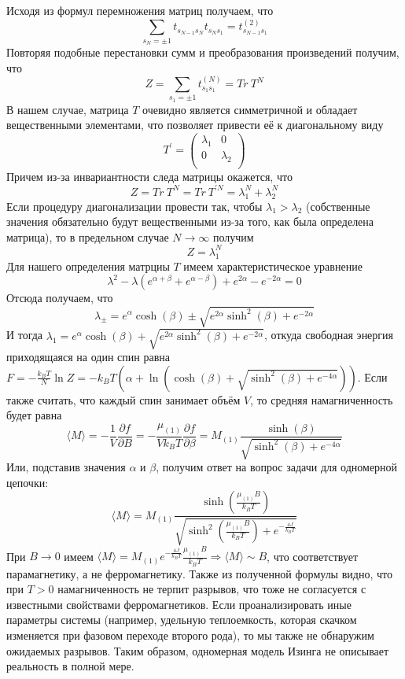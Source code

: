\documentclass[oneside,final,14pt]{extarticle}
\begin{document}
	Исходя из формул перемножения матриц получаем, что 
$$\sum_{s_{N}=\pm 1}t_{s_{N-1}s_{N}}t_{s_{N}s_{1}}=t^{(2)}_{s_{N-1}s_{1}}$$
	Повторяя подобные перестановки сумм и преобразования произведений получим, что 
$$Z=\sum_{s_{1}=\pm 1}t^{(N)}_{s_{1}s_{1}}=Tr \ T^{N}$$
	В нашем случае, матрица $T$ очевидно является симметричной и обладает вещественными элементами, что позволяет привести её к диагональному виду 
$$
T^\prime=
\begin{pmatrix}
\lambda_{1} & 0 \\
0 & \lambda_{2} \\
\end{pmatrix}
$$
	Причем из-за инвариантности следа матрицы окажется, что 
$$Z=Tr \ T^{N}=Tr \ T^{\prime N}=\lambda_{1}^N+\lambda_{2}^{N}$$
	Если процедуру диагонализации провести так, чтобы $\lambda_{1} > \lambda_{2}$ (собственные значения обязательно будут вещественными из-за того, как была определена матрица), то в предельном случае $N\rightarrow \infty$ получим 
$$Z=\lambda_1^{N}$$
	Для нашего определения матрциы $T$ имеем характеристическое уравнение 
$$\lambda^2-\lambda(e^{\alpha+\beta}+e^{\alpha-\beta})+e^{2\alpha}-e^{-2\alpha}=0$$
	Отсюда получаем, что 
$$\lambda_{\pm}=e^{\alpha}\cosh(\beta)\pm\sqrt{e^{2\alpha}\sinh^{2}(\beta)+e^{-2\alpha}}$$
	И тогда $\lambda_{1}=e^{\alpha}\cosh(\beta)+\sqrt{e^{2\alpha}\sinh^{2}(\beta)+e^{-2\alpha}}$, откуда свободная энергия приходящаяся на один спин равна $F=-\frac{k_{B}T}{N}\ln Z=-k_{B}T\left(\alpha+\ln\left(\cosh(\beta)+\sqrt{\sinh^{2}(\beta)+e^{-4\alpha}}\right)\right)$. Если также считать, что каждый спин занимает объём $V$, то средняя намагниченность будет равна 
$$\langle M \rangle=-\frac{1}{V}\frac{\partial f}{\partial B}=-\frac{\mu_{(1)}}{Vk_{B}T}\frac{\partial f}{\partial \beta}=M_{(1)}\frac{\sinh(\beta)}{\sqrt{\sinh^2(\beta)+e^{-4\alpha}}}$$
	Или, подставив значения $\alpha$ и $\beta$, получим ответ на вопрос задачи для одномерной цепочки:
$$\boxed{\langle M \rangle = M_{(1)}\frac{\sinh\left(\frac{\mu_{(1)}B}{k_{B}T}\right)}{\sqrt{\sinh^2\left(\frac{\mu_{(1)}B}{k_{B}T}\right)+e^{-\frac{4J}{k_{B}T}}}}}$$ 
	При $B\rightarrow 0$ имеем $\langle M \rangle=M_{(1)}e^{-\frac{4J}{k_{B}T}}\frac{\mu_(1)B}{k_{B}T} \Rightarrow \langle M \rangle \sim B$, что соответствует парамагнетику, а не ферромагнетику. Также из полученной формулы видно, что при $T>0$ намагниченность не терпит разрывов, что тоже не согласуется с известными свойствами ферромагнетиков. Если проанализировать иные параметры системы (например, удельную теплоемкость, которая скачком изменяется при фазовом переходе второго рода), то мы также не обнаружим ожидаемых разрывов. Таким образом, одномерная модель Изинга не описывает реальность в полной мере. 
\end{document}
